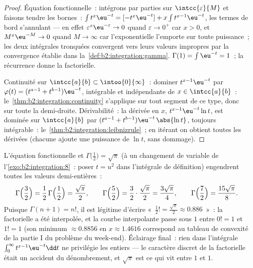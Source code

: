 \begin{proof}
Équation fonctionnelle~: intégrons par parties sur $\intcc{\varepsilon}{M}$
et faisons tendre les bornes~: $\int t^{x}\eu^{-t} = [-t^x\eu^{-t}] + x\int
t^{x-1}\eu^{-t}$, les termes de bord s'annulant --- en effet
$\varepsilon^x\eu^{-\varepsilon} \to 0$ quand $\varepsilon \to
0^+$ car $x > 0$, et $M^x\eu^{-M} \to 0$ quand $M \to \infty$
car l'exponentielle l'emporte sur toute puissance~; les deux
intégrales tronquées convergent vers leurs valeurs impropres par la convergence
établie dans la~\cref{def:b2:integration:gamma}. $\Gamma(1) = \int
\eu^{-t} = 1$~; la récurrence donne la factorielle.

Continuité sur $\intcc{a}{b} \subset \intoo{0}{\infty}$~: dominer
$t^{x-1}\eu^{-t}$ par $\varphi(t) = (t^{a-1} + t^{b-1})\eu^{-t}$,
intégrable et indépendante de $x \in \intcc{a}{b}$~:
le~\cref{thm:b2:integration:continuity} s'applique sur tout segment de ce type,
donc sur toute la demi-droite. Dérivabilité~: la dérivée en $x$,
$t^{x-1}\eu^{-t}\ln t$, est dominée sur $\intcc{a}{b}$ par $(t^{a-1}
+ t^{b-1})\eu^{-t}\,\abs{\ln t}$, toujours intégrable~:
le~\cref{thm:b2:integration:leibnizrule}~; en itérant on obtient toutes les
dérivées (chacune ajoute une puissance de $\ln t$, sans dommage).
\end{proof}

\begin{example}\label{ex:b2:integration:halffactorial}
L'équation fonctionnelle et $\Gamma\bigl(\frac12\bigr) =
\sqrt\pi$ (à un changement de variable de
l'\cref{exo:b2:integration:8}~: poser $t = u^2$ dans l'intégrale
de définition) engendrent toutes les valeurs demi-entières~:
\[
\Gamma\Bigl(\frac32\Bigr) = \frac12\,\Gamma\Bigl(\frac12\Bigr)
= \frac{\sqrt\pi}{2},
\qquad
\Gamma\Bigl(\frac52\Bigr) = \frac32\cdot\frac{\sqrt\pi}{2}
= \frac{3\sqrt\pi}{4},
\qquad
\Gamma\Bigl(\frac72\Bigr) = \frac{15\sqrt\pi}{8} .
\]
Puisque $\Gamma(n+1) = n!$, il est légitime d'écrire «~$\frac12! =
\frac{\sqrt\pi}{2} \approx 0.886$~»~: la factorielle a été
interpolée, et la courbe interpolante passe sous $1$
entre $0! = 1$ et $1! = 1$ (son minimum $\approx 0.8856$ en
$x \approx 1.4616$ correspond au tableau de convexité de la
partie I du problème du week-end). Éclairage final~: rien dans
l'intégrale $\int_0^\infty t^{x-1}\eu^{-t}\dd t$ ne privilégie
les entiers --- le caractère discret de la factorielle était un accident
du dénombrement, et $\sqrt\pi$ est ce qui vit entre $1$ et $1$.
\end{example}


